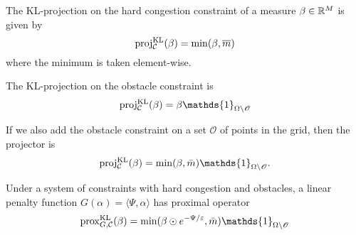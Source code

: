 \documentclass[../report.tex]{subfiles}
\begin{document}
\begin{prop}\label{prop:KLproxExamples}
	The KL-projection on the hard congestion constraint of a measure $\beta\in\mathbb{R}^M$ is given by
	\begin{equation}
	\operatorname{proj}^{\operatorname{KL}}_{\mathcal{C}}(\beta) = \min(\beta,\overline{m})
	\end{equation}
	where the minimum is taken element-wise.
	
	The KL-projection on the obstacle constraint is
	\begin{equation}
	\proj^{\KL}_\calC (\beta) = \beta \mathds{1}_{\Omega\backslash\mathscr{O}}
	\end{equation}
	
	If we also add the obstacle constraint on a set $\mathscr{O}$ of points in the grid, then the projector is
	\begin{equation}
	\proj^{\KL}_\calC(\beta) = \min(\beta, \bar{m})\mathds{1}_{\Omega\backslash\mathscr{O}}.
	\end{equation}
	
	Under a system of constraints with hard congestion and obstacles, a linear penalty function $G(\alpha) = \langle\Psi, \alpha\rangle$ has proximal operator
	\begin{equation}
	\prox^{\KL}_{G,\calC}(\beta) =
	\min(\beta\odot e^{-\Psi/\epsilon},\bar{m}) \mathds{1}_{\Omega\backslash\mathscr{O}}
	\end{equation}
\end{prop}
\end{document}
